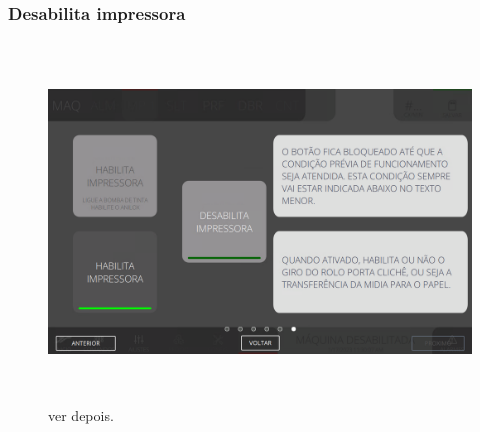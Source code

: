 \newpage
\thispagestyle{fancy}
\vspace*{\fill}
\subsubsection{\small{Desabilita impressora}}
\begin{figure}[h]
  \centering
  \includegraphics[width=576px,height=360px]{src/images/04-printter/02-printter/commands/e-6.png}
  \caption{ver depois.}
   \label{}
\end{figure}
\vspace*{\fill}